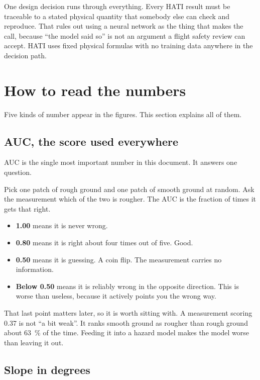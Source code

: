 \documentclass[11pt]{article}
\begin{document}
One design decision runs through everything. Every HATI result must be traceable to a
stated physical quantity that somebody else can check and reproduce. That rules out
using a neural network as the thing that makes the call, because ``the model said so''
is not an argument a flight safety review can accept. HATI uses fixed physical
formulas with no training data anywhere in the decision path.

\section{How to read the numbers}

Five kinds of number appear in the figures. This section explains all of them.

\subsection{AUC, the score used everywhere}

AUC is the single most important number in this document. It answers one question.

Pick one patch of rough ground and one patch of smooth ground at random. Ask the
measurement which of the two is rougher. The AUC is the fraction of times it gets that
right.

\begin{itemize}
\item \textbf{\num{1.00}} means it is never wrong.
\item \textbf{\num{0.80}} means it is right about four times out of five. Good.
\item \textbf{\num{0.50}} means it is guessing. A coin flip. The measurement carries no information.
\item \textbf{Below \num{0.50}} means it is reliably wrong in the opposite direction. This is
worse than useless, because it actively points you the wrong way.
\end{itemize}

That last point matters later, so it is worth sitting with. A measurement scoring
\num{0.37} is not ``a bit weak''. It ranks smooth ground as rougher than rough ground
about \SI{63}{\percent} of the time. Feeding it into a hazard model makes the model
worse than leaving it out.

\subsection{Slope in degrees}
\end{document}
